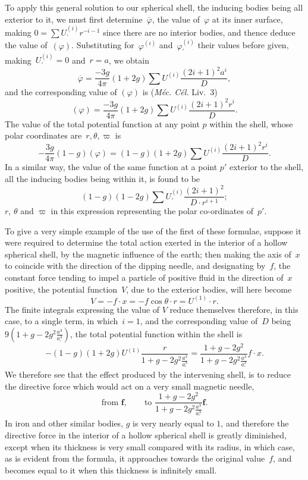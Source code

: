 \documentclass[11pt,notitlepage]{amsart}
\let\Title\textit
\renewcommand{\phi}{\varphi}
\begin{document}
To apply this general solution to our spherical shell, the inducing bodies
being all exterior to it, we must first determine~$\overline\phi$,
the value of~$\phi$ at its
inner surface, making $0=\sum U_\prime^{(i)}r^{-i-1}$
since there are no interior bodies, and
thence deduce the value of~$(\phi)$.
Substituting for~$\phi^{(i)}$ and~$\phi_\prime^{(i)}$ their values
before given, making~$U_\prime^{(i)}=0$ and~$r=a$, we obtain
\[
\overline\phi=
\frac{-3g}{4\pi}(1+2g)\sum U^{(i)}\frac{(2i+1)^2a^i}{D},
\]
and the corresponding value of $(\phi)$ is (\Title{M\'ec. C\'el.} Liv.~3)
\[
(\phi)=
\frac{-3g}{4\pi}(1+2g)\sum U^{(i)}\frac{(2i+1)^2r^i}{D}.
\]
The value of the total potential function at any point $p$ within the shell, whose
polar coordinates are~$r,\theta,\varpi$ is
\[
-\frac{3g}{4\pi}(1-g)(\phi)=(1-g)(1+2g)\sum U^{(i)}\frac{(2i+1)^2r^i}{D}.
\]
In a similar way, the value of the same function at a point $p'$ exterior to
the shell, all the inducing bodies being within it, is found to be
\[
(1-g)(1-2g)\sum U_\prime^{(i)}\frac{(2i+1)^2}{D\cdot r^{i+1}};
\]
$r$, $\theta$ and $\varpi$ in this expression
representing the polar co-ordinates of~$p'$.

To give a very simple example of the use of the first of these formulae,
suppose it were required to determine the total action exerted in the
interior of a hollow spherical shell, by the magnetic influence of the earth;
then making the axis of~$x$ to coincide
with the direction of the dipping needle,
and designating by~$f$,
the constant force tending to impel a particle of positive
fluid in the direction of~$x$ positive,
the potential function~$V$, due to the exterior
bodies, will here become
\[
V=-f\cdot x=-f\cos\theta\cdot r=U^{(1)}\cdot r.
\]
The finite integrals expressing the value of $V$ reduce themselves therefore,
in this case, to a single term, in which~$i=1$, and the corresponding value
of~$D$ being~$9(1+g-2g^2\frac{a^3}{a_\prime^3})$,
the total potential function within the shell is
\[
-(1-g)(1+2g)U^{(1)}\frac{r}{1+g-2g^2\frac{a^3}{a_\prime^3}}
=\frac{1+g-2g^2}{1+g-2g^2\frac{a^3}{a_\prime^3}}f\cdot x.
\]
We therefore see that the effect produced by the intervening shell, is to reduce
the directive force which would act on a very small magnetic needle,
\[
\text{from~}\mathbold{f},\qquad
\text{to~}\frac{1+g-2g^2}{1+g-2g^2\frac{a^3}{a_\prime^3}}
\mathbold{f}.
\]
In iron and other similar bodies, $g$ is very nearly equal to $1$,
and therefore the
directive force in the interior of a hollow spherical shell
is greatly diminished,
except when its thickness is very small compared with its radius, in which
case, as is evident from the formula,
it approaches towards the original value~$f$,
and becomes equal to it when this thickness is infinitely small.
\end{document}
